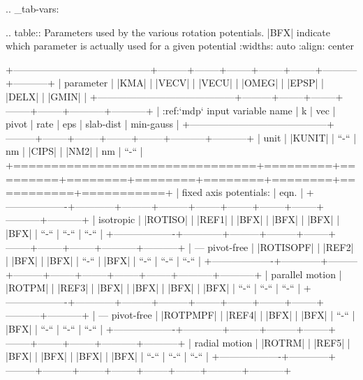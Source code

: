 .. _tab-vars:

.. table:: Parameters used by the various rotation potentials.
           |BFX| indicate which parameter is actually used for a given potential
           :widths: auto
           :align: center

           +------------------------------------------+---------+--------+--------+--------+--------+-----------+-----------+
           | parameter                                | |KMA|   | |VECV| | |VECU| | |OMEG| | |EPSP| | |DELX|    | |GMIN|    |
           +------------------------------------------+---------+--------+--------+--------+--------+-----------+-----------+
           | :ref:`mdp` input variable name           | k       | vec    | pivot  | rate   | eps    | slab-dist | min-gauss |
           +------------------------------------------+---------+--------+--------+--------+--------+-----------+-----------+
           | unit                                     | |KUNIT| | ``-``  | nm     | |CIPS| | |NM2|  | nm        | ``-``     |
           +================================+=========+=========+========+========+========+========+===========+===========+
           | fixed axis potentials:         | eqn.                                                                          |
           +-------------------+------------+---------+---------+--------+--------+--------+--------+-----------+-----------+
           | isotropic         | |ROTISO|   | |REF1|  | |BFX|   | |BFX|  | |BFX|  | |BFX|  | ``-``  | ``-``     | ``-``     |
           +-------------------+------------+---------+---------+--------+--------+--------+--------+-----------+-----------+
           | --- pivot-free    | |ROTISOPF| | |REF2|  | |BFX|   | |BFX|  | ``-``  | |BFX|  | ``-``  | ``-``     | ``-``     |
           +-------------------+------------+---------+---------+--------+--------+--------+--------+-----------+-----------+
           | parallel motion   | |ROTPM|    | |REF3|  | |BFX|   | |BFX|  | |BFX|  | |BFX|  | ``-``  | ``-``     | ``-``     |
           +-------------------+------------+---------+---------+--------+--------+--------+--------+-----------+-----------+
           | --- pivot-free    | |ROTPMPF|  | |REF4|  | |BFX|   | |BFX|  | ``-``  | |BFX|  | ``-``  | ``-``     | ``-``     |
           +-------------------+------------+---------+---------+--------+--------+--------+--------+-----------+-----------+
           | radial motion     | |ROTRM|    | |REF5|  | |BFX|   | |BFX|  | |BFX|  | |BFX|  | ``-``  | ``-``     | ``-``     |
           +-------------------+------------+---------+---------+--------+--------+--------+--------+-----------+-----------+
